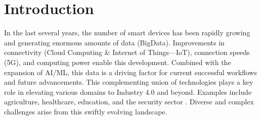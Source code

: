 \chapter{Introduction}


In the last several years, the number of smart devices has been rapidly growing and generating enormous amounts of data (BigData).
Improvements in connectivity (Cloud Computing \& Internet of Things—IoT), connection speeds (5G), and computing power enable this development.
Combined with the expansion of AI/ML, this data is a driving factor for current successful workflows and future advancements.
This complementing union of technologies plays a key role in elevating various domains to Industry 4.0 and beyond.
Examples include agriculture, healthcare, education, and the security sector \cite{paper:ai_edge_iot_review}.
Diverse and complex challenges arise from this swiftly evolving landscape.





